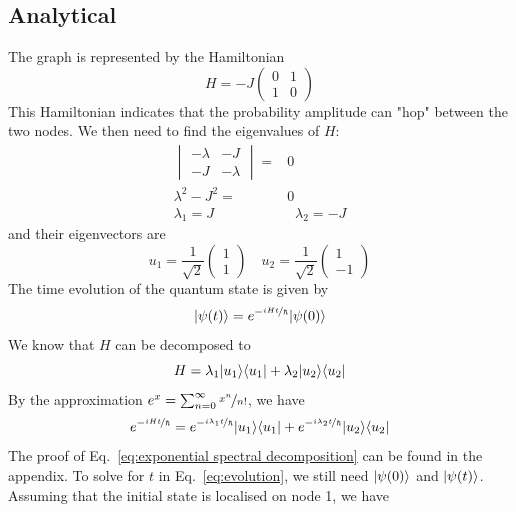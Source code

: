 \documentclass[aps]{revtex4-2}
\DeclarePairedDelimiter\bra{\langle}{\rvert}
\DeclarePairedDelimiter\ket{\lvert}{\rangle}
\begin{document}
\subsection{Analytical}
\noindent The graph is represented by the Hamiltonian
\begin{equation}
    H=-J\begin{pmatrix}
        0&1\\
        1&0
    \end{pmatrix}
\end{equation}
This Hamiltonian indicates that the probability amplitude can "hop" between the two nodes.
We then need to find the eigenvalues of $H$:
\begin{align}
    \begin{vmatrix}
        -\lambda&-J\\
        -J&-\lambda
    \end{vmatrix}=&0\nonumber\\
    \lambda^2-J^2=&0\nonumber\\
    \lambda_1=J\;&\;\;\lambda_2=-J
\end{align}
and their eigenvectors are
\begin{equation}
    u_1=\frac{1}{\sqrt{2}}\begin{pmatrix}
        1\\
        1
    \end{pmatrix}\quad u_2=\frac{1}{\sqrt{2}}\begin{pmatrix}
        1\\
        -1
    \end{pmatrix}
\end{equation}
The time evolution of the quantum state is given by
\begin{equation}
    \label{eq:evolution}
    \ket{\psi(t)}=e^{-\nicefrac{iHt}{\hbar}}\ket{\psi(0)}
\end{equation}
We know that $H$ can be decomposed to
\begin{equation}
    \label{eq:hamiltonian spectral decomposition}
    H=\lambda_1\ket{u_1}\bra{u_1}+\lambda_2\ket{u_2}\bra{u_2}
\end{equation}
By the approximation $e^x=\sum_{n=0}^\infty\nicefrac{x^n}{n!}$, we have
\begin{equation}
    \label{eq:exponential spectral decomposition}
    e^{-\nicefrac{iHt}{\hbar}}=e^{-\nicefrac{i\lambda_1t}{\hbar}}\ket{u_1}\bra{u_1}+e^{-\nicefrac{i\lambda_2t}{\hbar}}\ket{u_2}\bra{u_2}
\end{equation}
The proof of Eq.~\ref{eq:exponential spectral decomposition} can be found in the appendix. To solve for $t$ in Eq.~\ref{eq:evolution}, we still need $\ket{\psi(0)}$ and $\ket{\psi(t)}$. Assuming that the initial state is localised on node 1, we have
\end{document}
